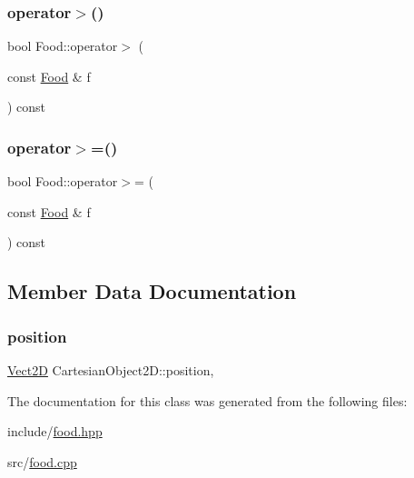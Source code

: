 \subsubsection{\texorpdfstring{operator$>$()}{operator>()}}
{\footnotesize\ttfamily bool Food\+::operator$>$ (\begin{DoxyParamCaption}\item[{const \hyperlink{classFood}{Food} \&}]{f }\end{DoxyParamCaption}) const}

\mbox{\label{classFood_a8f2ac4d8b5434d35947b038390fab95d_a8f2ac4d8b5434d35947b038390fab95d}} 
\subsubsection{\texorpdfstring{operator$>$=()}{operator>=()}}
{\footnotesize\ttfamily bool Food\+::operator$>$= (\begin{DoxyParamCaption}\item[{const \hyperlink{classFood}{Food} \&}]{f }\end{DoxyParamCaption}) const}



\subsection{Member Data Documentation}
\mbox{\label{classCartesianObject2D_ae02ec6ed11f9bfc0c748da033d6a32f9_ae02ec6ed11f9bfc0c748da033d6a32f9}} 
\subsubsection{\texorpdfstring{position}{position}}
{\footnotesize\ttfamily \hyperlink{classVect2D}{Vect2D} Cartesian\+Object2\+D\+::position\hspace{0.3cm}{\ttfamily [protected]}, {\ttfamily [inherited]}}



The documentation for this class was generated from the following files\+:\begin{DoxyCompactItemize}
\item 
include/\hyperlink{food_8hpp}{food.\+hpp}\item 
src/\hyperlink{food_8cpp}{food.\+cpp}\end{DoxyCompactItemize}
